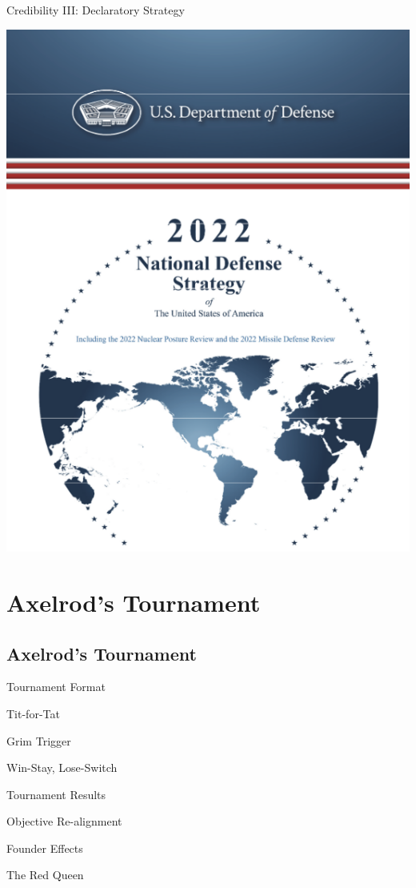 \documentclass[pdf]{beamer}
\begin{document}
\begin{frame}{Credibility III: Declaratory Strategy}
  \begin{center}
    \includegraphics[scale=0.2]{npr_title_page_2022.png}
  \end{center}
\end{frame}

\section{Axelrod's Tournament}
\subsection{Axelrod's Tournament}
\begin{frame}{Tournament Format}
\end{frame}
\begin{frame}{Tit-for-Tat}
\end{frame}
\begin{frame}{Grim Trigger}
\end{frame}
\begin{frame}{Win-Stay, Lose-Switch}
\end{frame}
\begin{frame}{Tournament Results}
\end{frame}
\begin{frame}{Objective Re-alignment}
\end{frame}
\begin{frame}{Founder Effects}
\end{frame}
\begin{frame}{The Red Queen}
\end{frame}
\end{document}
